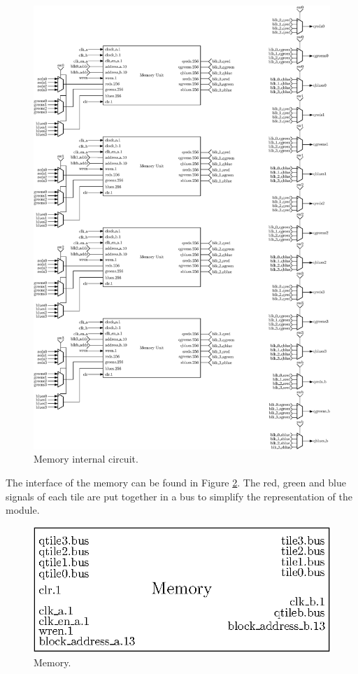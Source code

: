 \begin{figure}[H]
    \centering
    \includegraphics[scale=0.55]{Chapter4-GPU_CLKU/res/memory_in_part1}
    \caption{Memory internal circuit.}
    \label{fig:gpu/memory_in}
\end{figure}

The interface of the memory can be found in Figure \ref{fig:gpu/memory}. 
The red, green and blue signals of each tile 
are put together in a bus to simplify the representation of the module.

\begin{figure}[H]
    \centering
    \includegraphics[scale=1.0]{Chapter4-GPU_CLKU/res/memory}
    \caption{Memory.}
    \label{fig:gpu/memory}
\end{figure}

